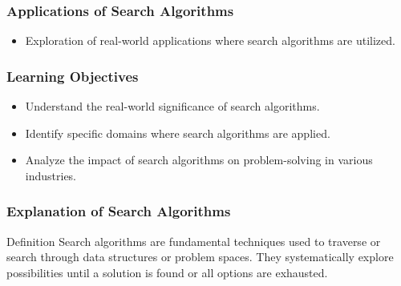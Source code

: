 \documentclass[aspectratio=169]{beamer}
\begin{document}
\begin{frame}
    \frametitle{Applications of Search Algorithms}
    \begin{itemize}
        \item Exploration of real-world applications where search algorithms are utilized.
    \end{itemize}
\end{frame}

\begin{frame}
    \frametitle{Learning Objectives}
    \begin{itemize}
        \item Understand the real-world significance of search algorithms.
        \item Identify specific domains where search algorithms are applied.
        \item Analyze the impact of search algorithms on problem-solving in various industries.
    \end{itemize}
\end{frame}

\begin{frame}
    \frametitle{Explanation of Search Algorithms}
    \begin{block}{Definition}
        Search algorithms are fundamental techniques used to traverse or search through data structures or problem spaces. They systematically explore possibilities until a solution is found or all options are exhausted.
    \end{block}
\end{frame}
\end{document}

